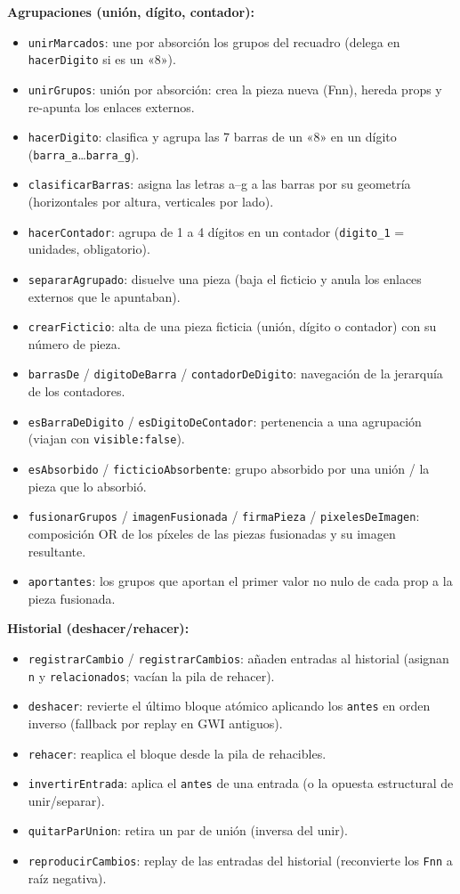 \documentclass[../main.tex]{subfiles}
\begin{document}
\textbf{Agrupaciones (unión, dígito, contador):}
\begin{itemize}
	\item \texttt{unirMarcados}: une por absorción los grupos del
	recuadro (delega en \texttt{hacerDigito} si es un «8»).
	\item \texttt{unirGrupos}: unión por absorción: crea la pieza nueva
	(Fnn), hereda props y re-apunta los enlaces externos.
	\item \texttt{hacerDigito}: clasifica y agrupa las 7 barras de un
	«8» en un dígito (\texttt{barra\_a}\ldots\texttt{barra\_g}).
	\item \texttt{clasificarBarras}: asigna las letras a--g a las barras
	por su geometría (horizontales por altura, verticales por lado).
	\item \texttt{hacerContador}: agrupa de 1 a 4 dígitos en un
	contador (\texttt{digito\_1} = unidades, obligatorio).
	\item \texttt{separarAgrupado}: disuelve una pieza (baja el
	ficticio y anula los enlaces externos que le apuntaban).
	\item \texttt{crearFicticio}: alta de una pieza ficticia (unión,
	dígito o contador) con su número de pieza.
	\item \texttt{barrasDe} / \texttt{digitoDeBarra} /
	\texttt{contadorDeDigito}: navegación de la jerarquía de los
	contadores.
	\item \texttt{esBarraDeDigito} / \texttt{esDigitoDeContador}:
	pertenencia a una agrupación (viajan con \texttt{visible:false}).
	\item \texttt{esAbsorbido} / \texttt{ficticioAbsorbente}: grupo
	absorbido por una unión / la pieza que lo absorbió.
	\item \texttt{fusionarGrupos} / \texttt{imagenFusionada} /
	\texttt{firmaPieza} / \texttt{pixelesDeImagen}: composición OR de
	los píxeles de las piezas fusionadas y su imagen resultante.
	\item \texttt{aportantes}: los grupos que aportan el primer valor no
	nulo de cada prop a la pieza fusionada.
\end{itemize}

\textbf{Historial (deshacer/rehacer):}
\begin{itemize}
	\item \texttt{registrarCambio} / \texttt{registrarCambios}: añaden
	entradas al historial (asignan \texttt{n} y \texttt{relacionados};
	vacían la pila de rehacer).
	\item \texttt{deshacer}: revierte el último bloque atómico aplicando
	los \texttt{antes} en orden inverso (fallback por replay en GWI
	antiguos).
	\item \texttt{rehacer}: reaplica el bloque desde la pila de
	rehacibles.
	\item \texttt{invertirEntrada}: aplica el \texttt{antes} de una
	entrada (o la opuesta estructural de unir/separar).
	\item \texttt{quitarParUnion}: retira un par de unión (inversa del
	unir).
	\item \texttt{reproducirCambios}: replay de las entradas del
	historial (reconvierte los \texttt{Fnn} a raíz negativa).
\end{itemize}
\end{document}
